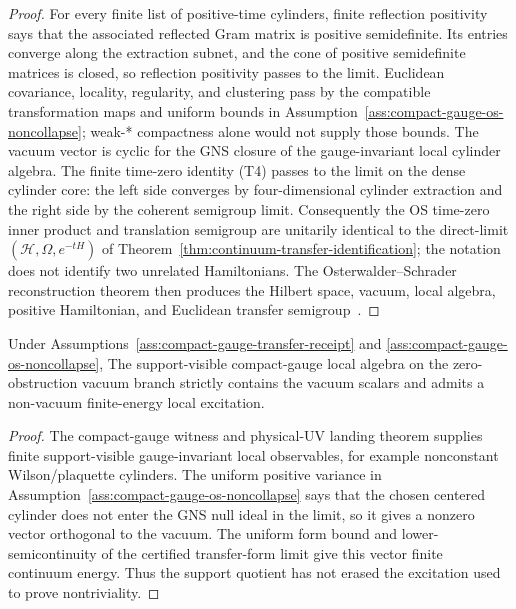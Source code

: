 \begin{proof}
For every finite list of positive-time cylinders, finite reflection positivity says that the
associated reflected Gram matrix is positive semidefinite. Its entries converge along the
extraction subnet, and the cone of positive semidefinite matrices is closed, so reflection
positivity passes to the limit. Euclidean covariance, locality, regularity, and clustering pass by
the compatible transformation maps and uniform bounds in
Assumption~\ref{ass:compact-gauge-os-noncollapse}; weak-* compactness alone would not supply those
bounds. The vacuum vector is cyclic for the GNS closure of the gauge-invariant local cylinder
algebra. The finite time-zero identity (T4) passes to the limit on the dense cylinder core:
the left side converges by four-dimensional cylinder extraction and the right side by the coherent
semigroup limit. Consequently the OS time-zero inner product and translation semigroup are
unitarily identical to the direct-limit \((\mathcal H,\Omega,e^{-tH})\) of
Theorem~\ref{thm:continuum-transfer-identification}; the notation does not identify two unrelated
Hamiltonians. The
Osterwalder--Schrader reconstruction theorem then produces the Hilbert space, vacuum, local
algebra, positive Hamiltonian, and Euclidean transfer semigroup~\cite{osterwalderSchrader73,
osterwalderSchrader75}.
\end{proof}

\begin{proposition}
\label{prop:compact-gauge-nontriviality-yang-mills}
Under Assumptions~\ref{ass:compact-gauge-transfer-receipt} and
\ref{ass:compact-gauge-os-noncollapse},
The support-visible compact-gauge local algebra on the zero-obstruction vacuum branch strictly
contains the vacuum scalars and admits a non-vacuum finite-energy local excitation.
\end{proposition}

\begin{proof}
The compact-gauge witness and physical-UV landing theorem supplies finite support-visible
gauge-invariant local observables, for example nonconstant Wilson/plaquette cylinders. The uniform
positive variance in Assumption~\ref{ass:compact-gauge-os-noncollapse} says that the chosen
centered cylinder does not enter the GNS null ideal in the limit, so it gives a nonzero vector
orthogonal to the vacuum. The uniform form bound and lower-semicontinuity of the certified
transfer-form limit give this vector finite continuum energy. Thus the support quotient has not
erased the excitation used to prove nontriviality.
\end{proof}

